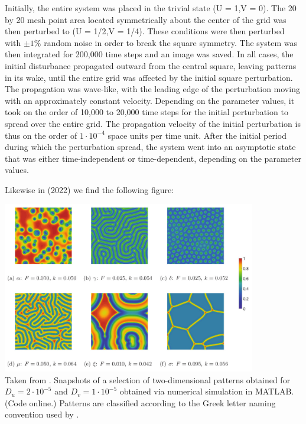Initially, the entire system was placed in the trivial state (U = 1,V = 0). The 20 by
20 mesh point area located symmetrically about the center of the grid was then
perturbed to (U = 1/2,V = 1/4). These conditions were then perturbed with $\pm 1\%$
random noise in order to break the square symmetry. The system was then integrated
for 200,000 time steps and an image was
saved. In all cases, the initial disturbance
propagated outward from the central
square, leaving patterns in its wake, until
the entire grid was affected by the initial
square perturbation. The propagation was
wave-like, with the leading edge of the
perturbation moving with an approximately
constant velocity. Depending on the parameter values, it took on the order of 10,000 to
20,000 time steps for the initial perturbation
to spread over the entire grid. The propagation velocity of the initial perturbation is
thus on the order of $1\cdot 10^{-4}$ space units per time unit. After the initial period during
which the perturbation spread, the system
went into an asymptotic state that was either
time-independent or time-dependent, depending on the parameter values.

Likewise in \textcite{gane22} (2022) we find the following figure:
\begin{center}
\includegraphics[height=7.5cm]{python_codes/fieldstone_171/images/gane22}\\
{\captionfont Taken from \cite{gane22}. 
Snapshots of a selection of two-dimensional patterns obtained for
$D_u=2\cdot 10^{-5}$ and $D_v=1\cdot 10^{-5}$ obtained via numerical 
simulation in MATLAB. (Code online.) Patterns
are classified according to the Greek letter naming convention used by \textcite{pear93}.
} 
\end{center}

